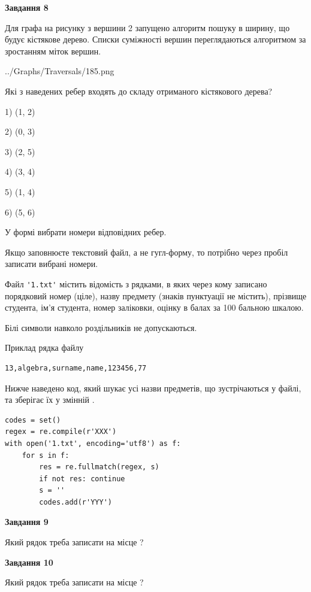 \documentclass[12pt, ukrainian]{article}
\def\code#1{\Verb!#1!}
\begin{document}
{\begin {large}
{\begin {center}\textbf{Завдання 8}\end {center}}\par
Для графа на рисунку з вершини 2 запущено алгоритм пошуку в ширину, що будує кістякове дерево. Списки суміжності вершин переглядаються алгоритмом за зростанням міток вершин.\par
\begin{center}
	{../Graphs/Traversals/185.png}
\end{center}
\par Які з наведених ребер входять до складу отриманого кістякового дерева?\par
1) (1, 2)\par
2) (0, 3)\par
3) (2, 5)\par
4) (3, 4)\par
5) (1, 4)\par
6) (5, 6)\par
{\vskip 15pt} У формі вибрати номери відповідних ребер.


Якщо заповнюєте текстовий файл, а не гугл-форму, то потрібно через пробіл записа\-ти вибрані номери.\par
\newpage


Файл \code{'1.txt'} містить відомість з рядками, в яких через кому записано поряд\-ковий номер (ціле), назву предмету (знаків пунктуації не містить), прізвище студента, ім'я студента, номер заліковки, оцінку в балах за 100 бальною шкалою.

Білі символи навколо роздільників не допускаються.

Приклад рядка файлу



\begin{verbatim}
13,algebra,surname,name,123456,77
\end{verbatim}


Нижче наведено код, який шукає усі назви предметів, що зустрічаються у файлі, та зберігає їх у змінній .



\begin{verbatim}
codes = set()
regex = re.compile(r'XXX')
with open('1.txt', encoding='utf8') as f:
    for s in f:
        res = re.fullmatch(regex, s)
        if not res: continue
        s = ''
        codes.add(r'YYY')
\end{verbatim}


{\begin {center}\textbf{Завдання 9}\end {center}}\par
Який рядок треба записати на місце  ?\par
\vspace{5mm}


{\begin {center}\textbf{Завдання 10}\end {center}}\par
Який рядок треба записати на місце  ?\par


\newpage


\end {large}}
\end{document}
